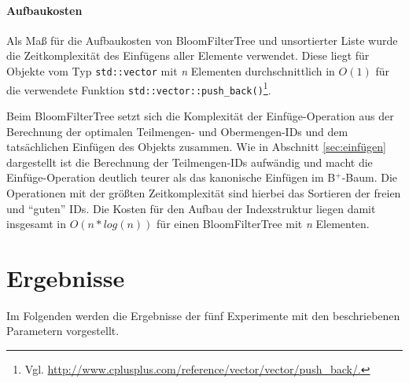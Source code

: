 \paragraph*{Aufbaukosten}
Als Maß für die Aufbaukosten von BloomFilterTree und unsortierter Liste wurde die Zeitkomplexität des Einfügens aller Elemente verwendet. Diese liegt für Objekte vom Typ \texttt{std::vector} mit \textit{n} Elementen durchschnittlich in $O(1)$ für die verwendete Funktion \texttt{std::vector::push\_back()}\footnote{Vgl. \url{http://www.cplusplus.com/reference/vector/vector/push_back/.}}. 

Beim BloomFilterTree setzt sich die Komplexität der Einfüge-Operation aus der Berechnung der optimalen Teilmengen- und Obermengen-IDs und dem tatsächlichen Einfügen des Objekts zusammen. Wie in Abschnitt \ref{sec:einfügen} dargestellt ist die Berechnung der Teilmengen-IDs aufwändig und macht die Einfüge-Operation deutlich teurer als das kanonische Einfügen im B$^+$-Baum. Die Operationen mit der größten Zeitkomplexität sind hierbei das Sortieren der freien und "`guten"' IDs. Die Kosten für den Aufbau der Indexstruktur liegen damit insgesamt in $O(n\ast log(n))$ für einen BloomFilterTree mit \textit{n} Elementen. 
\section{Ergebnisse}\label{sec:ergebnisse}
Im Folgenden werden die Ergebnisse der fünf Experimente mit den beschriebenen Parametern vorgestellt. 
